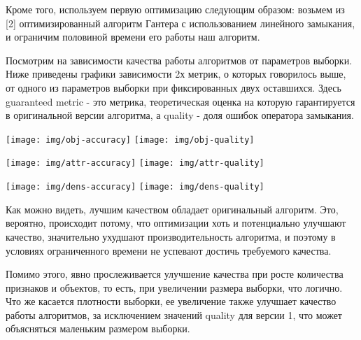Кроме того, используем первую оптимизацию следующим образом: возьмем из [2] оптимизированный алгоритм Гантера с использованием линейного замыкания, и ограничим половиной времени его работы наш алгоритм.

Посмотрим на зависимости качества работы алгоритмов от параметров выборки. Ниже приведены графики зависимости 2х метрик, о которых говорилось выше, от одного из параметров выборки при фиксированных двух оставшихся. Здесь guaranteed metric - это метрика, теоретическая оценка на которую гарантируется в оригинальной версии алгоритма, а quality - доля ошибок оператора замыкания.

\texttt{[image: img/obj-accuracy]}
\texttt{[image: img/obj-quality]}

\texttt{[image: img/attr-accuracy]}
\texttt{[image: img/attr-quality]}

\texttt{[image: img/dens-accuracy]}
\texttt{[image: img/dens-quality]}

Как можно видеть, лучшим качеством обладает оригинальный алгоритм. Это, вероятно, происходит потому, что оптимизации хоть и потенциально улучшают качество, значительно ухудшают производительность алгоритма, и поэтому в условиях ограниченного времени не успевают достичь требуемого качества.

Помимо этого, явно прослеживается улучшение качества при росте количества признаков и объектов, то есть, при увеличении размера выборки, что логично. Что же касается плотности выборки, ее увеличение также улучшает качество работы алгоритмов, за исключением значений quality для версии 1, что может объясняться маленьким размером выборки.